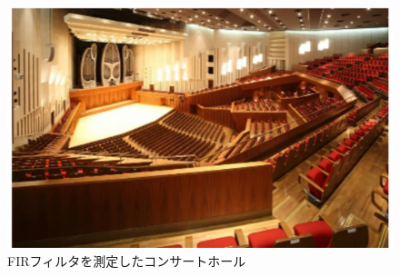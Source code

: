 \documentclass[11pt,a4j]{jreport}
\begin{document}
\lipsum[1-2]

\begin{figure}[H]
  \centering
  \includegraphics[width=.5\linewidth]{images/convolutedIrHall.jpg}
  \caption{FIRフィルタを測定したコンサートホール}
  \label{fig:FIRフィルタを測定したコンサートホール}
\end{figure}

\newpage
\end{document}

